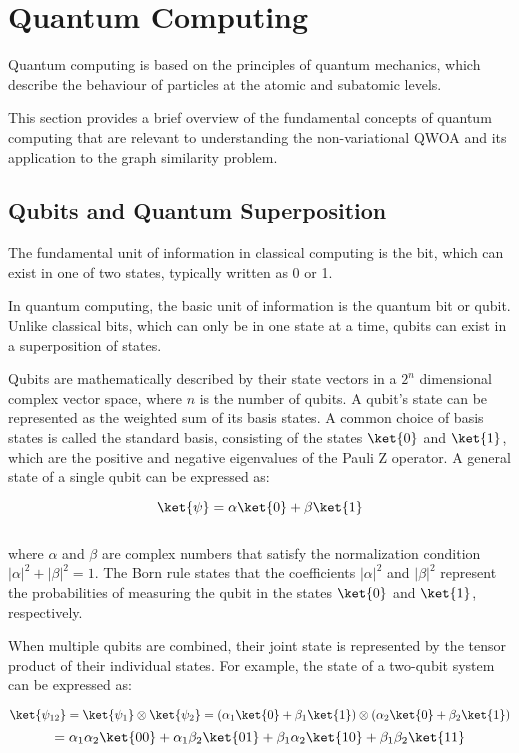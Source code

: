 \section{Quantum Computing}
Quantum computing is based on the principles of quantum mechanics, which describe the behaviour of particles at the atomic and subatomic levels.

This section provides a brief overview of the fundamental concepts of quantum computing that are relevant to understanding the non-variational QWOA and its application to the graph similarity problem. 

\subsection{Qubits and Quantum Superposition}

The fundamental unit of information in classical computing is the bit, which can exist in one of two states, typically written as 0 or 1.

In quantum computing, the basic unit of information is the quantum bit or qubit. Unlike classical bits, which can only be in one state at a time, qubits can exist in a superposition of states.

Qubits are mathematically described by their state vectors in a \(2^n\) dimensional complex vector space, where \(n\) is the number of qubits. A qubit's state can be represented as the weighted sum of its basis states. A common choice of basis states is called the standard basis, consisting of the states \( \ket{0} \) and \( \ket{1} \), which are the positive and negative eigenvalues of the Pauli Z operator. A general state of a single qubit can be expressed as:

\[\ket{\psi} = \alpha\ket{0} + \beta\ket{1}\]
\\
where \( \alpha \) and \( \beta \) are complex numbers that satisfy the normalization condition \( |\alpha|^2 + |\beta|^2 = 1 \). The Born rule states that the coefficients \( |\alpha|^2 \) and \( |\beta|^2 \) represent the probabilities of measuring the qubit in the states \( \ket{0} \) and \( \ket{1} \), respectively.

When multiple qubits are combined, their joint state is represented by the tensor product of their individual states. For example, the state of a two-qubit system can be expressed as:

\[\ket{\psi_{12}} = \ket{\psi_1} \otimes \ket{\psi_2} = (\alpha_1\ket{0} + \beta_1\ket{1}) \otimes (\alpha_2\ket{0} + \beta_2\ket{1})\]
\[= \alpha_1\alpha_2\ket{00} + \alpha_1\beta_2\ket{01} + \beta_1\alpha_2\ket{10} + \beta_1\beta_2\ket{11}\]

